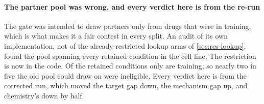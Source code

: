 \paragraph{The partner pool was wrong, and every verdict here is from the re-run}
The gate was intended to draw partners only from drugs that were in training,
which is what makes it a fair contest in every split. An audit of its own
implementation, not of the already-restricted lookup arms of
\cref{sec:res-lookup}, found the pool spanning every retained condition in the
cell line. The restriction is now in the code. Of the
 retained conditions only
 are training, so nearly two in five the old pool could
draw on were ineligible.
Every verdict here is from the corrected run, which moved the target gap down,
the mechanism gap up, and chemistry's down by half.

